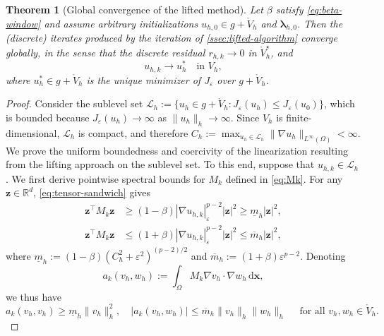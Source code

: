 \documentclass[11pt,pdflatex,sn-mathphys-num]{sn-jnl}
\theoremstyle{thmstyleone}%
\newtheorem{theorem}{Theorem}%
\theoremstyle{thmstyletwo}%
\theoremstyle{thmstylethree}%
\newcommand{\bs}[1]{\ensuremath{\boldsymbol{#1}}}
\begin{document}
\begin{theorem}[Global convergence of the lifted method]
\label{thm:finite-dimensional-lifted-global-convergence}
Let $\beta$ satisfy \eqref{eq:beta-window} and assume arbitrary initializations $u_{h,0}\in g+\mathring{V}_{h}$
and 
$\bs\lambda_{h,0}$. 
Then the (discrete) iterates produced by the iteration of \cref{ssec:lifted-algorithm} converge globally, in the sense that the discrete residual
$r_{h,k}\to 0$ in $\mathring{V}_{h}^\star$,
and
\begin{equation*}
  u_{h,k}\to u_h^* \quad\text{in }V_h,
\end{equation*}
where $u_h^*\in g+\mathring{V}_{h}$ is the unique minimizer of $J_\varepsilon$ over $g+\mathring{V}_{h}$.
\end{theorem}
\begin{proof}
Consider the sublevel set
$\mathcal L_h:=\{u_h\in g+\mathring{V}_h:J_\varepsilon(u_h)\le J_\varepsilon(u_0)\}$, which is bounded because
$J_\varepsilon(u_h)\to \infty$ as $\|u_h\|_h\to \infty$. %
Since $V_h$ is finite-dimensional, $\mathcal{L}_h$ is compact, and therefore
$ C_h:=\max_{u_h\in\mathcal L_h}\|\nabla u_h\|_{L^\infty(\Omega)}<\infty$.
We prove the uniform boundedness and coercivity of the linearization resulting from the lifting approach on the sublevel set. To this end, suppose that $u_{h,k}\in\mathcal L_h$.
We first derive pointwise spectral bounds for $M_k$ defined in \eqref{eq:Mk}. For any $\bs z\in\mathbb R^d$,
\eqref{eq:tensor-sandwich} gives
\begin{equation}\label{eq:spectral-lower-upper}
  \begin{aligned}
    \bs z^\top M_k \bs z
    &\geq (1-\beta)|\nabla u_{h,k}|_\varepsilon^{p-2}|\bs z|^2
    \geq \underline m_h
    |\bs z|^2,\\
  \bs z^\top M_k \bs z&\leq (1+\beta)|\nabla u_{h,k}|_\varepsilon^{p-2}|\bs z|^2\leq
  \overline m_h |\bs z|^2,
  \end{aligned}
\end{equation}
where $\underline m_h:=(1-\beta)(C_h^2+\varepsilon^2)^{(p-2)/2}$ and  $\overline m_h:=(1+\beta)\varepsilon^{p-2}$.
Denoting
\begin{equation*}
  a_k(v_h,w_h):=\int_\Omega M_k\nabla v_h\cdot\nabla w_h\,\mathrm{d}\bs x,
\end{equation*}
we thus have
\begin{equation}\label{eq:Mk-coercive-bounded}
  a_k(v_h,v_h)\geq \underline m_h\|v_h\|_h^2, \quad |a_k(v_h,w_h)| \leq \overline m_h\|v_h\|_h\|w_h\|_h \quad\text{ for all } v_h,w_h\in\mathring{V}_h.

\end{equation}
\end{proof}
\end{document}
